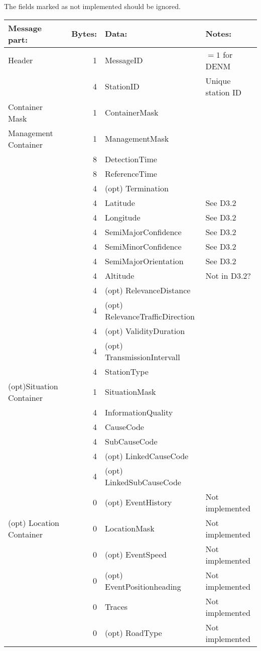 \documentclass[11pt]{article}
\begin{document}
The fields marked as not implemented should be ignored.

\begin{center}
\begin{tabular}{lrll}
Message part: & Bytes: & Data: & Notes:\\
\hline
Header & 1 & MessageID & \(=1\) for DENM\\
 & 4 & StationID & Unique station ID\\
\hline
Container Mask & 1 & ContainerMask & \\
\hline
Management Container & 1 & ManagementMask & \\
 & 8 & DetectionTime & \\
 & 8 & ReferenceTime & \\
 & 4 & (opt) Termination & \\
 & 4 & Latitude & See D3.2\\
 & 4 & Longitude & See D3.2\\
 & 4 & SemiMajorConfidence & See D3.2\\
 & 4 & SemiMinorConfidence & See D3.2\\
 & 4 & SemiMajorOrientation & See D3.2\\
 & 4 & Altitude & Not in D3.2?\\
 & 4 & (opt) RelevanceDistance & \\
 & 4 & (opt) RelevanceTrafficDirection & \\
 & 4 & (opt) ValidityDuration & \\
 & 4 & (opt) TransmissionIntervall & \\
 & 4 & StationType & \\
\hline
(opt)Situation Container & 1 & SituationMask & \\
 & 4 & InformationQuality & \\
 & 4 & CauseCode & \\
 & 4 & SubCauseCode & \\
 & 4 & (opt) LinkedCauseCode & \\
 & 4 & (opt) LinkedSubCauseCode & \\
 & 0 & (opt) EventHistory & Not implemented\\
\hline
(opt) Location Container & 0 & LocationMask & Not implemented\\
 & 0 & (opt) EventSpeed & Not implemented\\
 & 0 & (opt) EventPositionheading & Not implemented\\
 & 0 & Traces & Not implemented\\
 & 0 & (opt) RoadType & Not implemented\\

\end{tabular}
\end{center}
\end{document}
